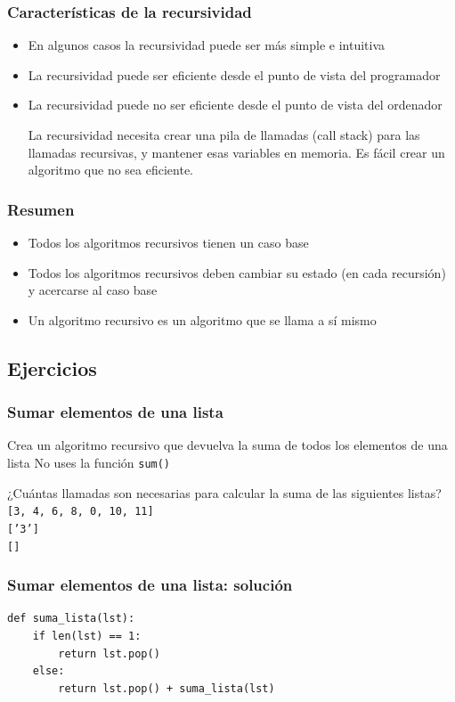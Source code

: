 \documentclass[11pt]{beamer}
\begin{document}
	\begin{frame}\frametitle{Características de la recursividad}
	\begin{itemize}
	\item En algunos casos la recursividad puede ser más simple e intuitiva
	\item La recursividad puede ser eficiente desde el punto de vista del programador
	\item La recursividad puede no ser eficiente desde el punto de vista del ordenador
	\begin{block}{}
	La recursividad necesita crear una pila de llamadas (call stack) para las llamadas recursivas, y mantener esas variables en memoria. Es fácil crear un algoritmo que no sea eficiente.
	\end{block}
	\end{itemize}
	\end{frame}

	\begin{frame}\frametitle{Resumen}
	\begin{itemize}
	\item Todos los algoritmos recursivos tienen un caso base
	\item Todos los algoritmos recursivos deben cambiar su estado (en cada recursión) y acercarse al caso base
	\item Un algoritmo recursivo es un algoritmo que se llama a sí mismo
	\end{itemize}
	\end{frame}

	\subsection{Ejercicios}

	\begin{frame}\frametitle{Sumar elementos de una lista}
	\begin{block}{Crea un algoritmo recursivo que devuelva la suma de todos los elementos de una lista}
No uses la función \texttt{sum()}
\end{block}
	\begin{block}{¿Cuántas llamadas son necesarias para calcular la suma de las siguientes listas?}
\texttt{[3, 4, 6, 8, 0, 10, 11]} \\
\texttt{['3']} \\
\texttt{[]}
\end{block}
	\end{frame}


	\begin{frame}[fragile]\frametitle{Sumar elementos de una lista: solución}
	\begin{lstlisting}
def suma_lista(lst):
    if len(lst) == 1:
        return lst.pop()
    else:
        return lst.pop() + suma_lista(lst)
\end{lstlisting}
	\end{frame}
\end{document}
